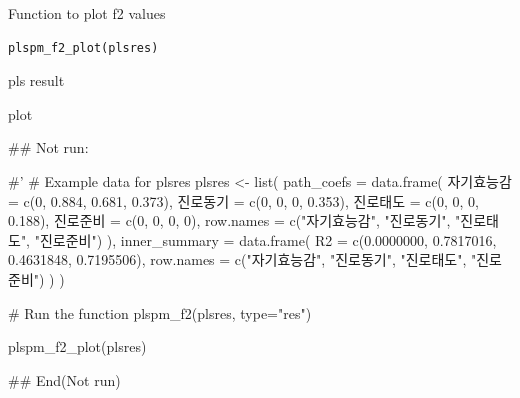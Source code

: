 \documentclass[a4paper]{book}
\begin{document}
%
\begin{Description}
Function to plot f2 values
\end{Description}
%
\begin{Usage}
\begin{verbatim}
plspm_f2_plot(plsres)
\end{verbatim}
\end{Usage}
%
\begin{Arguments}
\begin{ldescription}
\item[\code{plsres}] pls result
\end{ldescription}
\end{Arguments}
%
\begin{Value}
plot
\end{Value}
%
\begin{Examples}
\begin{ExampleCode}
\#\# Not run: 

#'
# Example data for plsres
plsres <- list(
  path_coefs = data.frame(
    자기효능감 = c(0, 0.884, 0.681, 0.373),
    진로동기 = c(0, 0, 0, 0.353),
    진로태도 = c(0, 0, 0, 0.188),
    진로준비 = c(0, 0, 0, 0),
    row.names = c("자기효능감", "진로동기", "진로태도", "진로준비")
  ),
  inner_summary = data.frame(
    R2 = c(0.0000000, 0.7817016, 0.4631848, 0.7195506),
    row.names = c("자기효능감", "진로동기", "진로태도", "진로준비")
  )
)

# Run the function
plspm_f2(plsres, type="res")



plspm_f2_plot(plsres)

## End(Not run)


\end{ExampleCode}
\end{Examples}
\end{document}
